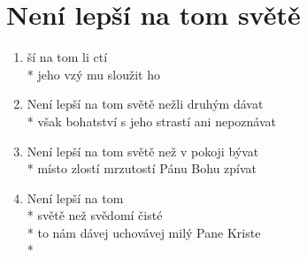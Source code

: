 \section{Není lepší na tom světě}
\begin{enumerate}
\item {} ší na tom  li  ctí \\*
jeho vzý mu sloužit ho  
\item Není lepší na tom světě nežli druhým dávat \\*
však bohatství s jeho strastí ani nepoznávat 
\item Není lepší na tom světě než v pokoji bývat \\*
místo zlostí mrzutostí Pánu Bohu zpívat 
\item Není lepší na tom \\*
světě než svědomí čisté \\*
to nám dávej uchovávej milý Pane Kriste \\*
\end{enumerate}
